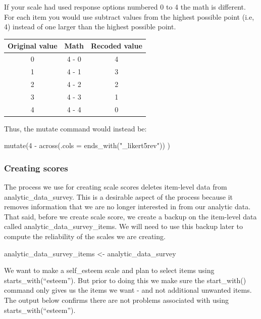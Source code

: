 \documentclass[
]{krantz}
\makeatletter
\newenvironment{Shaded}{\begin{snugshade}}{\end{snugshade}}
\newcommand{\NormalTok}[1]{#1}
\newcommand{\OtherTok}[1]{\textcolor[rgb]{0.37,0.37,0.37}{#1}}
\newenvironment{kframe}{%
\medskip{}
\setlength{\fboxsep}{.8em}
 \def\at@end@of@kframe{}%
 \ifinner\ifhmode%
  \def\at@end@of@kframe{\end{minipage}}%
  \begin{minipage}{\columnwidth}%
 \fi\fi%
 \def\FrameCommand##1{\hskip\@totalleftmargin \hskip-\fboxsep
 \colorbox{shadecolor}{##1}\hskip-\fboxsep
     \hskip-\linewidth \hskip-\@totalleftmargin \hskip\columnwidth}%
 \MakeFramed {\advance\hsize-\width
   \@totalleftmargin\z@ \linewidth\hsize
   \@setminipage}}%
 {\par\unskip\endMakeFramed%
 \at@end@of@kframe}
\newenvironment{rmdblock}[1]
  {
  \begin{itemize}
  \renewcommand{\labelitemi}{
    \raisebox{-.7\height}[0pt][0pt]{
      {\setkeys{Gin}{width=3em,keepaspectratio}\texttt{[image: images/\#1]}}
    }
  }
  \setlength{\fboxsep}{1em}
  \begin{kframe}
  \item
  }
  {
  \end{kframe}
  \end{itemize}
  }
\newenvironment{rmdcaution}
  {\begin{rmdblock}{caution}}
  {\end{rmdblock}}
\renewenvironment{Shaded}{\begin{kframe}}{\end{kframe}}
\makeatother
\begin{document}
\begin{rmdcaution}
If your scale had used response options numbered 0 to 4 the math is different.
For each item you would use subtract values from the highest possible point (i.e, 4) instead of one larger than the highest possible point.

\begin{longtable}[]{@{}ccc@{}}
\toprule
Original value & Math & Recoded value \\
\midrule
\endhead
0 & 4 - 0 & 4 \\
1 & 4 - 1 & 3 \\
2 & 4 - 2 & 2 \\
3 & 4 - 3 & 1 \\
4 & 4 - 4 & 0 \\
\bottomrule
\end{longtable}

Thus, the mutate command would instead be:

mutate(4 - across(.cols = ends\_with("\_likert5rev")) )
\end{rmdcaution}

\hypertarget{creating-scores-2}{%
\subsubsection{Creating scores}\label{creating-scores-2}}

The process we use for creating scale scores deletes item-level data from analytic\_data\_survey. This is a desirable aspect of the process because it removes information that we are no longer interested in from our analytic data. That said, before we create scale score, we create a backup on the item-level data called analytic\_data\_survey\_items. We will need to use this backup later to compute the reliability of the scales we are creating.

\begin{Shaded}
\begin{Highlighting}[]
\NormalTok{analytic\_data\_survey\_items }\OtherTok{\textless{}{-}}\NormalTok{ analytic\_data\_survey}
\end{Highlighting}
\end{Shaded}

We want to make a self\_esteem scale and plan to select items using starts\_with(``esteem''). But prior to doing this we make sure the start\_with() command only gives us the items we want - and not additional unwanted items. The output below confirms there are not problems associated with using starts\_with(``esteem'').
\end{document}
